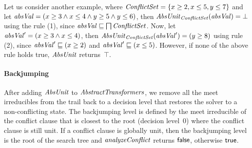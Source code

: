 Let us consider another example, where $\mathit{ConflictSet} = \{x \geq 2, x
\leq 5, y \leq 7 \}$ and let $\mathit{absVal} = (x \geq 3\wedge x \leq 4\wedge
y \geq 5\wedge y \leq 6)$, then $\mathit{AbsUnit}_{\mathit{ConflictSet}}(\mathit{absVal}) = \bot$
using the rule (1), since $\mathit{absVal} \sqsubseteq \bigsqcap\mathit{ConflictSet}$.  Now,
let $\mathit{absVal}' = (x \geq 3\wedge x \leq 4)$, then
$\mathit{AbsUnit}_{\mathit{ConflictSet}}(\mathit{absVal}') = (y \geq 8)$ using rule (2), since
$\mathit{absVal}' \sqsubseteq (x \geq 2)$ and $\mathit{absVal}' \sqsubseteq (x \leq
5)$.  However, if none of the above rule holds true, $\mathit{AbsUnit}$ returns~$\top$.
 
\paragraph {\textbf{Backjumping}}
After adding $\mathit{AbsUnit}$ to $\mathit{AbstractTransformers}$, we remove all the meet irreducibles from the trail back to a decision level that restores the solver to a
non-conflicting state.  The backjumping level is defined by the
meet irreducible of the conflict clause 
that is closest to the root (decision level~0) where the conflict
clause is still unit.  If a conflict clause is globally unit, then the
backjumping level is the root of the search tree and
$\mathit{analyzeConflict}$ returns $\mathsf{false}$, otherwise $\mathsf{true}$.


